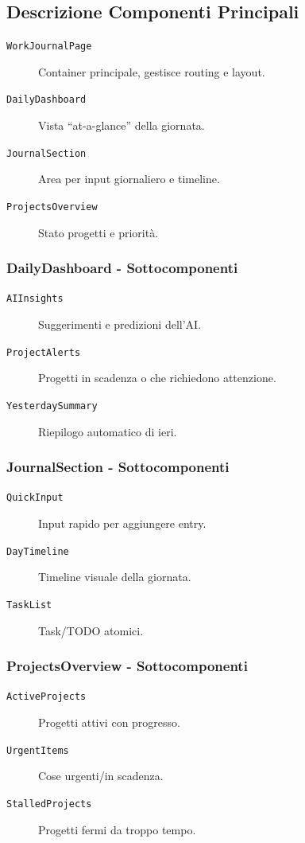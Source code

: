 \documentclass[11pt,a4paper]{article}
\begin{document}
\subsection{Descrizione Componenti Principali}

\begin{description}
    \item[\texttt{WorkJournalPage}] Container principale, gestisce routing e layout.
    \item[\texttt{DailyDashboard}] Vista ``at-a-glance'' della giornata.
    \item[\texttt{JournalSection}] Area per input giornaliero e timeline.
    \item[\texttt{ProjectsOverview}] Stato progetti e priorità.
\end{description}

\subsubsection{DailyDashboard - Sottocomponenti}
\begin{description}
    \item[\texttt{AIInsights}] Suggerimenti e predizioni dell'AI.
    \item[\texttt{ProjectAlerts}] Progetti in scadenza o che richiedono attenzione.
    \item[\texttt{YesterdaySummary}] Riepilogo automatico di ieri.
\end{description}

\subsubsection{JournalSection - Sottocomponenti}
\begin{description}
    \item[\texttt{QuickInput}] Input rapido per aggiungere entry.
    \item[\texttt{DayTimeline}] Timeline visuale della giornata.
    \item[\texttt{TaskList}] Task/TODO atomici.
\end{description}

\subsubsection{ProjectsOverview - Sottocomponenti}
\begin{description}
    \item[\texttt{ActiveProjects}] Progetti attivi con progresso.
    \item[\texttt{UrgentItems}] Cose urgenti/in scadenza.
    \item[\texttt{StalledProjects}] Progetti fermi da troppo tempo.
\end{description}
\end{document}
